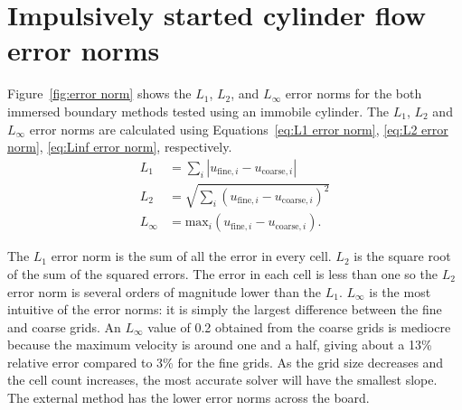\section{Impulsively started cylinder flow error norms}
Figure~\ref{fig:error norm} shows the $L_1$, $L_2$, and $L_\infty$ error norms for the both immersed boundary methods tested using an immobile cylinder.
The $L_1$, $L_2$ and $L_\infty$ error norms are calculated using Equations~\eqref{eq:L1 error norm}, \eqref{eq:L2 error norm}, \eqref{eq:Linf error norm}, respectively.
\begin{align}
	L_1 &= \sum_{i} \left|u_{\text{fine}, i}-u_{\text{coarse},i}\right| \label{eq:L1 error norm} \\
	L_2 &= \sqrt{\sum_{i} \left(u_{\text{fine}, i}-u_{\text{coarse},i}\right)^2} \label{eq:L2 error norm} \\
	L_{\infty} &= \text{max}_i\left(u_{\text{fine}, i}-u_{\text{coarse},i}\right) .\ \label{eq:Linf error norm}
\end{align}

The $L_1$ error norm is the sum of all the error in every cell. 
$L_2$ is the square root of the sum of the squared errors. 
The error in each cell is less than one so the $L_2$ error norm is several orders of magnitude lower than the $L_1$. 
$L_\infty$ is the most intuitive of the error norms: it is simply the largest difference between the fine and coarse grids. 
An $L_\infty$ value of 0.2 obtained from the coarse grids is mediocre because the maximum velocity is around one and a half, giving about a 13\% relative error compared to 3\% for the fine grids. 
As the grid size decreases and the cell count increases, the most accurate solver will have the smallest slope. 
The external method has the lower error norms across the board. 

